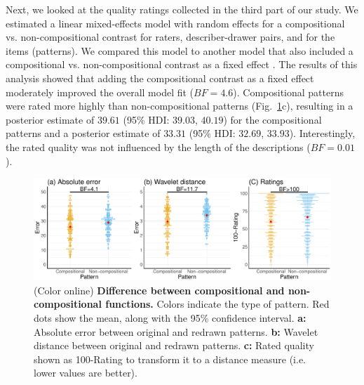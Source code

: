 \documentclass[a4paper,man, floatsintext, natbib]{apa6}
\begin{document}
Next, we looked at the quality ratings collected in the third part of our study. We estimated a linear mixed-effects model with random effects for a compositional vs. non-compositional contrast for raters, describer-drawer pairs, and for the items (patterns). We compared this model to another model that also included a compositional vs. non-compositional contrast as a fixed effect \citep[following the logic of][]{barr2013random}. The results of this analysis showed that adding the compositional contrast as a fixed effect moderately improved the overall model fit ($BF=4.6$). Compositional patterns were rated more highly than non-compositional patterns (Fig.~\ref{fig:quality}c), resulting in a posterior estimate of $39.61$ (95\% HDI: $39.03$, $40.19$) for the compositional patterns and a posterior estimate of $33.31$ (95\% HDI: $32.69$, $33.93$). Interestingly, the rated quality was not influenced by the length of the descriptions ($BF=0.01$).

\begin{figure}[ht!] 
\centerline{\includegraphics[width=1.05\textwidth]{behavioral.pdf}}
\caption{(Color online) \textbf{Difference between compositional and non-compositional functions.} Colors indicate the type of pattern. Red dots show the mean, along with the 95\% confidence interval. \textbf{a:} Absolute error between original and redrawn patterns. \textbf{b:} Wavelet distance between original and redrawn patterns. \textbf{c:} Rated quality shown as 100-Rating to transform it to a distance measure (i.e. lower values are better).}
\label{fig:quality}
\end{figure}
\end{document}
